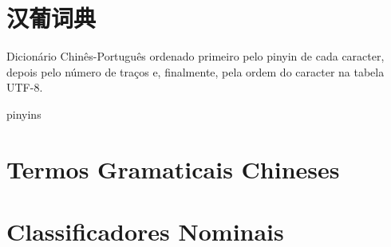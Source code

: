 \documentclass[a4paper,9pt,twoside,openright,book]{memoir}
\begin{document}



\clearpage
\pagestyle{empty}
\tableofcontents

\clearpage
\pagestyle{empty}
\chapter{汉葡词典}

%
%

Dicionário Chinês-Português ordenado primeiro pelo pinyin de cada
caracter, depois pelo número de traços e, finalmente, pela ordem do
caracter na tabela UTF-8.

\clearpage
\begin{DictionaryEntries}{pinyins}
 
 
 
 
 
 
 
 
 
 
 
 
 
 
 
 
 
 
 
 
 
 
 
\end{DictionaryEntries} 

\ifdraftdoc
\else

\clearpage
\chapter{Termos Gramaticais Chineses}


\clearpage
\chapter{Classificadores Nominais}

\end{document}
